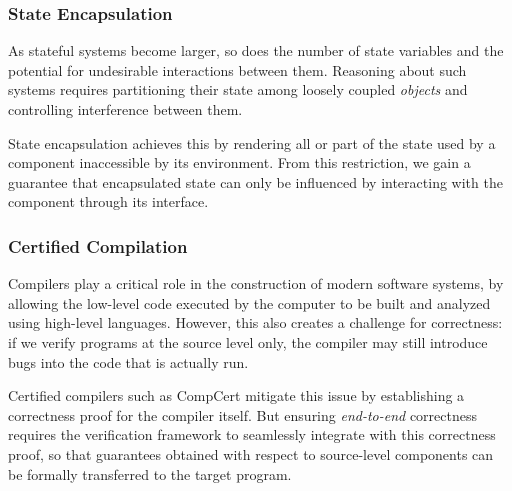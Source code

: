 \documentclass[acmsmall,screen,review,anonymous]{acmart}
\begin{document}

\subsubsection{State Encapsulation} \label{sec:req:encap} %

As stateful systems become larger,
so does the number of state variables
and the potential for undesirable interactions between them.
Reasoning about such systems
requires partitioning their state
among loosely coupled \emph{objects}
and controlling interference between them.

State encapsulation achieves this by rendering
all or part of the state used by a component
inaccessible by its environment.
From this restriction,
we gain a guarantee that
encapsulated state can only be influenced
by interacting with the component through its interface.



\subsubsection{Certified Compilation} \label{sec:req:cc} %

Compilers play a critical role
in the construction of modern software systems,
by allowing the low-level code
executed by the computer
to be built and analyzed
using high-level languages.
However, this also creates a challenge
for correctness:
if we verify programs at the source level only,
the compiler may still introduce bugs
into the code that is actually run.

Certified compilers such as CompCert \cite{compcert}
mitigate this issue by
establishing a correctness proof for the compiler itself.
But ensuring \emph{end-to-end} correctness
requires the verification framework to seamlessly integrate
with this correctness proof,
so that guarantees obtained with respect to source-level components
can be formally transferred to the target program.
\end{document}
